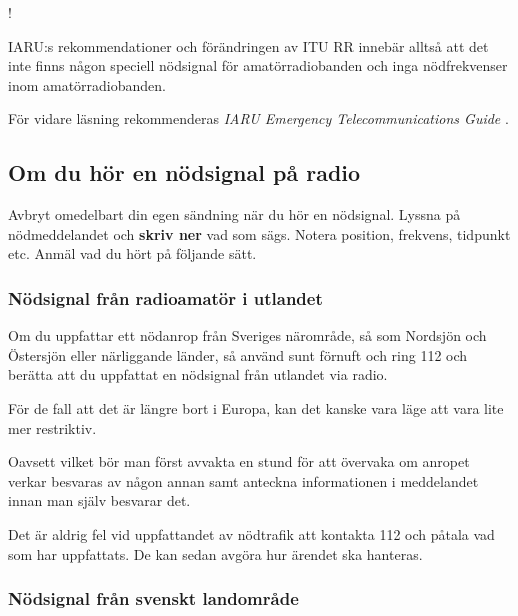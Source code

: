 \begin{center}
\begin{minipage}{0.19\columnwidth}
\Huge{\Huge{\hspace{1ex}!}}
\end{minipage}
\begin{minipage}{0.7\columnwidth}
IARU:s rekommendationer och förändringen av ITU RR innebär alltså att
det inte finns någon speciell nödsignal för amatörradiobanden och inga
nödfrekvenser inom amatörradiobanden.
\end{minipage}
\end{center}

För vidare läsning rekommenderas
\emph{IARU Emergency Telecommunications Guide} \cite{IARU-ETG}.

\newpage %
\subsection{Om du hör en nödsignal på radio}
\label{hör_nödtrafik}

Avbryt omedelbart din egen sändning när du hör en nödsignal. Lyssna på
nödmeddelandet och \textbf{skriv ner} vad som sägs.
Notera position, frekvens, tidpunkt etc. Anmäl vad du hört på följande sätt.

\subsubsection{Nödsignal från radioamatör i utlandet}

Om du uppfattar ett nödanrop från Sveriges närområde, så som Nordsjön och
Östersjön eller närliggande länder, så använd sunt förnuft och ring 112 och
berätta att du uppfattat en nödsignal från utlandet via radio.

För de fall att det är längre bort i Europa, kan det kanske vara läge att vara
lite mer restriktiv.

Oavsett vilket bör man först avvakta en stund för att övervaka om anropet verkar
besvaras av någon annan samt anteckna informationen i meddelandet innan man
själv besvarar det.

Det är aldrig fel vid uppfattandet av nödtrafik att kontakta 112 och påtala vad
som har uppfattats.
De kan sedan avgöra hur ärendet ska hanteras.

\subsubsection{Nödsignal från svenskt landområde}
\label{sv. nödsignal}

